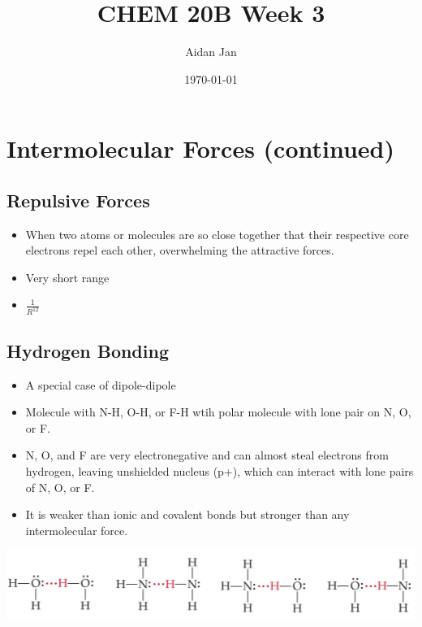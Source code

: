 \documentclass[10pt]{article}
\title{CHEM 20B Week 3}
\author{Aidan Jan}
\date{\today}
\begin{document}
\maketitle
\section*{Intermolecular Forces (continued)}
\subsection*{Repulsive Forces}
\begin{itemize}
    \item When two atoms or molecules are so close together that their respective core electrons repel each other, overwhelming the attractive forces.
    \item Very short range
    \item $\frac{1}{R^{12}}$
\end{itemize}

\subsection*{Hydrogen Bonding}
\begin{itemize}
    \item A special case of dipole-dipole
    \item Molecule with N-H, O-H, or F-H wtih polar molecule with lone pair on N, O, or F.
    \item N, O, and F are very electronegative and can almost steal electrons from hydrogen, leaving unshielded nucleus (p+), which can interact with lone pairs of N, O, or F.
    \item It is weaker than ionic and covalent bonds but stronger than any intermolecular force.
\end{itemize}
\begin{center}
    \includegraphics*[scale=0.5]{W3_1}
\end{center}

\pagebreak
\end{document}
